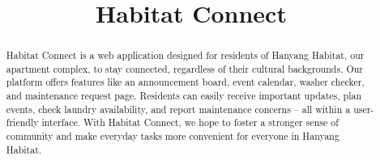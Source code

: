 \documentclass[conference]{IEEEtran}
\begin{document}
\title{Habitat Connect\\
}


\author{
\and
{}
\and
{}
}
\maketitle


\begin{abstract}
Habitat Connect is a web application designed for
residents of Hanyang Habitat, our apartment complex, to stay
connected, regardless of their cultural backgrounds. Our
platform offers features like an announcement board, event
calendar, washer checker, and maintenance request page.
Residents can easily receive important updates, plan events,
check laundry availability, and report maintenance concerns –
all within a user-friendly interface. With Habitat Connect, we
hope to foster a stronger sense of community and make
everyday tasks more convenient for everyone in Hanyang
Habitat.
\end{abstract}




\end{document}
